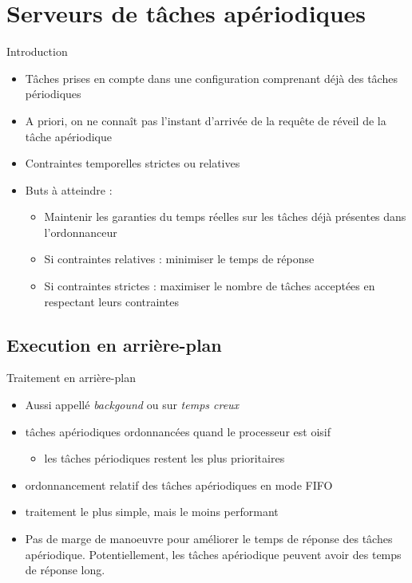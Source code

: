 \section{Serveurs de tâches apériodiques}


\begin{frame}{Introduction} 
  \begin{itemize}
  \item Tâches prises en compte dans une configuration comprenant déjà
    des tâches périodiques
  \item A priori, on ne  connaît pas l'instant d'arrivée de la requête
    de réveil de la tâche apériodique
  \item Contraintes temporelles strictes ou relatives 
  \item Buts à atteindre : 
    \begin{itemize}
    \item Maintenir les garanties du temps réelles sur les tâches déjà
      présentes dans l'ordonnanceur
    \item Si contraintes relatives : minimiser le temps de réponse
    \item  Si contraintes  strictes :  maximiser le  nombre  de tâches
      acceptées en respectant leurs contraintes
    \end{itemize}
  \end{itemize}
\end{frame}

\subsection{Execution en arrière-plan}

\begin{frame}{Traitement en arrière-plan} 
  \begin{itemize}
  \item Aussi appellé \emph{backgound} ou sur \emph{temps creux}
  \item tâches apériodiques ordonnancées quand le processeur est oisif 
    \begin{itemize}
    \item les tâches périodiques restent les plus prioritaires 
    \end{itemize}
  \item ordonnancement relatif des tâches apériodiques en mode FIFO 
  \item traitement le plus simple, mais le moins performant 
  \item Pas de  marge de manoeuvre pour améliorer  le temps de réponse
    des  tâches apériodique.  Potentiellement, les  tâches apériodique
    peuvent avoir des temps de réponse long.
  \end{itemize}
\end{frame}

